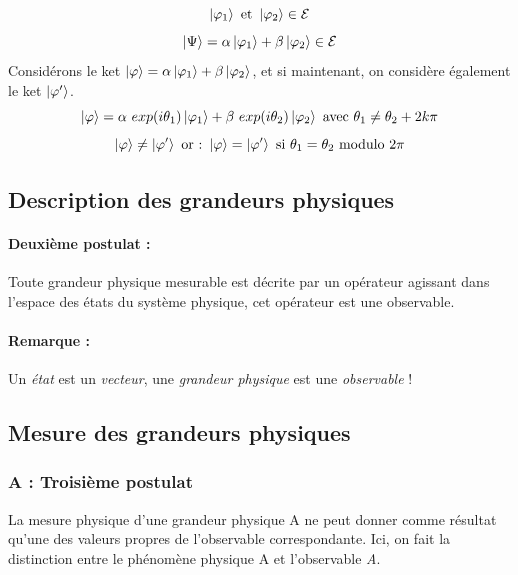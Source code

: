 \documentclass[12pt,a4paper,titlepage]{book}
\begin{document}
\begin{equation*}
\ket{\varphi_1} \text{ et } \ket{\varphi_2} \in \mathcal{E}
\end{equation*}
\begin{equation*}
\ket \Psi = \alpha\ket{\varphi_1} + \beta\ket{\varphi_2} \in \mathcal{E}
\end{equation*}
Considérons le ket $\ket \varphi = \alpha\ket{\varphi_1} + \beta\ket{\varphi_2}$, et si maintenant, on considère également le ket $\ket{\varphi'}$.
\begin{equation*}
\ket \varphi = \alpha ~exp(i \theta_1) \ket{\varphi_1} + \beta ~exp(i \theta_2)\ket{\varphi_2} ~\text{avec}~ \theta_1 \neq \theta_2 + 2k\pi
\end{equation*}
\begin{equation*}
\ket\varphi \neq \ket{\varphi'} ~\text{or :}~ \ket\varphi = \ket{\varphi'} ~\text{si}~ \theta_1 = \theta_2 \text{ modulo } 2\pi
\end{equation*}
\subsection{Description des grandeurs physiques}
\paragraph*{Deuxième postulat :}

Toute grandeur physique mesurable est décrite par un opérateur agissant dans l'espace des états du système physique, cet opérateur est une observable.

\paragraph*{Remarque :}

Un \textit{état} est un \textit{vecteur}, une \textit{grandeur physique} est une \textit{observable} !

\subsection{Mesure des grandeurs physiques}
\subsubsection{A : Troisième postulat}
La mesure physique d'une grandeur physique A ne peut donner comme résultat qu'une des valeurs propres de l'observable correspondante. Ici, on fait la distinction entre le phénomène physique A et l'observable \textit{A}.
\end{document}
